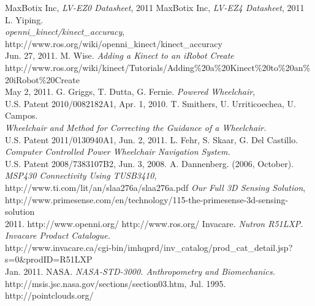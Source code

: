 \documentclass[oneside,final,a4paper]{report}
\begin{document}
\begin{thebibliography}{9}


  MaxBotix Inc, \emph{LV-EZ0 Datasheet},  2011
  MaxBotix Inc, \emph{LV-EZ4 Datasheet},  2011
  L. Yiping. \\
  \emph{openni\_kinect/kinect\_accuracy}, http://www.ros.org/wiki/openni\_kinect/kinect\_accuracy\\
  Jun. 27, 2011.
  M. Wise.  \emph{Adding a Kinect to an iRobot Create} \\
  http://www.ros.org/wiki/kinect/Tutorials/Adding\%20a\%20Kinect\%20to\%20an\%20iRobot\%20Create\\
  May 2, 2011.
  G. Griggs, T. Dutta, G. Fernie. \emph{Powered Wheelchair},\\
  U.S. Patent 2010/0082182A1, Apr. 1, 2010.
  T. Smithers, U. Urriticoechea, U. Campos. \\
  \emph{Wheelchair and Method for Correcting the Guidance of a Wheelchair.} \\
  U.S. Patent 2011/0130940A1, Jun. 2, 2011.
  L. Fehr, S. Skaar, G. Del Castillo. \\
  \emph{Computer Controlled Power Wheelchair Navigation System.} \\
  U.S. Patent 2008/7383107B2, Jun. 3, 2008.
  A. Dannenberg. (2006, October). \emph{MSP430 Connectivity Using TUSB3410},\\
  http://www.ti.com/lit/an/slaa276a/slaa276a.pdf
  \emph{Our Full 3D Sensing Solution}, \\
  \mbox{http://www.primesense.com/en/technology/115-the-primesense-3d-sensing-solution} \\
  2011.
  http://www.openni.org/
  http://www.ros.org/
  Invacare. \emph{Nutron R51LXP. Invacare Product Catalogue.} \\
  http://www.invacare.ca/cgi-bin/imhqprd/inv\_catalog/prod\_cat\_detail.jsp?s=0\&prodID=R51LXP\\
 Jan. 2011.
  NASA. \emph{NASA-STD-3000. Anthropometry and Biomechanics.}\\
  http://msis.jsc.nasa.gov/sections/section03.htm, Jul. 1995.
  http://pointclouds.org/
\end{thebibliography}
\end{document}

